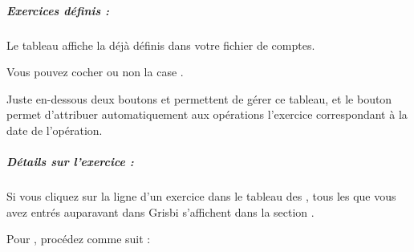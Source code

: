 
\subparagraph{Exercices définis :\label{setup-resources-financialyear-list}}

Le tableau affiche la  déjà définis dans votre fichier de comptes.

Vous pouvez cocher ou non la case .



Juste en-dessous deux boutons  et  permettent de gérer ce tableau, et le bouton  permet d'attribuer automatiquement aux opérations l'exercice correspondant à la date de l'opération.




\subparagraph{Détails sur l'exercice :\label{setup-resources-financialyear-details}}



Si vous cliquez sur la ligne d'un exercice dans le tableau des , tous les  que vous avez entrés auparavant dans Grisbi s'affichent dans la section .





Pour , procédez comme suit :

